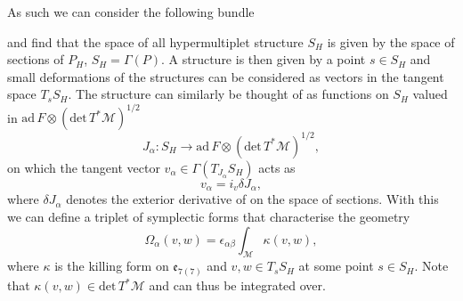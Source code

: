 As such we can consider the following bundle
\begin{center}
\end{center}
and find that the space of all hypermultiplet structure $S_{H}$ is given by the space of sections of $P_H$, $S_H = \Gamma(P)$. A structure is then given by a point $s\in S_H$ and small deformations of the structures can be considered as vectors in the tangent space $T_sS_H$. The structure can similarly be thought of as functions on $S_H$ valued in $\text{ad}\, F\otimes (\text{det}\, T^*\mathcal{M})^{1/2}$
\begin{equation}
    J_\alpha: S_H \to \text{ad}\, F\otimes (\text{det}\, T^*\mathcal{M})^{1/2},
\end{equation}
on which the tangent vector $v_\alpha\in\Gamma(T_{J_\alpha}S_H)$ acts as 
\begin{equation}
    v_\alpha = i_v \delta J_\alpha,
\end{equation}
where $\delta J_\alpha$ denotes the exterior derivative of on the space of sections. With this we can define a triplet of symplectic forms that characterise the geometry 
\begin{equation}
    \Omega_\alpha(v,w) = \epsilon_{\alpha\beta}\int_\mathcal{M} \kappa(v,w),
\end{equation}
where $\kappa$ is the killing form on $\mathfrak{e}_{7(7)}$ and $v,w\in T_s S_H$ at some point $s\in S_H$. Note that $\kappa(v,w)\in \text{det}\, T^*\mathcal{M}$ and can thus be integrated over.

